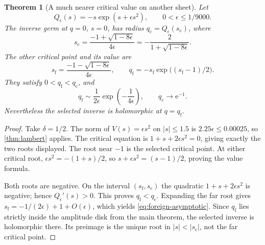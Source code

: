 \documentclass[11pt,a4paper]{article}
\numberwithin{equation}{section}
\newtheorem{theorem}{Theorem}[section]
\theoremstyle{definition}
\theoremstyle{remark}
\newcommand{\e}{\mathrm e}
\newcommand{\scv}{s_{\mathrm c}}
\newcommand{\qcv}{q_{\mathrm c}}
\begin{document}
\begin{theorem}[A much nearer critical value on another sheet]
\label{thm:foreign}
Let
\begin{equation}
 Q_\epsilon(s)=-s\exp(s+\epsilon s^2),
 \qquad 0<\epsilon\leq1/9000.
 \label{eq:quadratic-Q}
\end{equation}
The inverse germ at $q=0$, $s=0$, has radius $\qcv=Q_\epsilon(\scv)$, where
\begin{equation}
 \scv=\frac{-1+\sqrt{1-8\epsilon}}{4\epsilon}
      =-\frac{2}{1+\sqrt{1-8\epsilon}}.
 \label{eq:quadratic-sc}
\end{equation}
The other critical point and its value are
\begin{equation}
 s_{\mathrm f}=\frac{-1-\sqrt{1-8\epsilon}}{4\epsilon},
 \qquad q_{\mathrm f}=-s_{\mathrm f}
                       \exp\bigl((s_{\mathrm f}-1)/2\bigr).
 \label{eq:foreign-critical}
\end{equation}
They satisfy $0<q_{\mathrm f}<\qcv$, and
\begin{equation}
 q_{\mathrm f}\sim\frac1{2\epsilon}\exp\left(-\frac1{4\epsilon}\right),
 \qquad \qcv\longrightarrow\e^{-1}.
 \label{eq:foreign-asymptotic}
\end{equation}
Nevertheless the selected inverse is holomorphic at $q=q_{\mathrm f}$.
\end{theorem}
\begin{proof}
Take $\delta=1/2$. The norm of $V(s)=\epsilon s^2$ on $|s|\leq1.5$ is $2.25\epsilon\leq0.00025$, so \cref{thm:lambert} applies. The critical equation is
$1+s+2\epsilon s^2=0$, giving exactly the two roots displayed. The root near $-1$ is the selected critical point. At either critical root,
$\epsilon s^2=-(1+s)/2$, so $s+\epsilon s^2=(s-1)/2$, proving the value formula.

Both roots are negative. On the interval $(s_{\mathrm f},\scv)$ the quadratic $1+s+2\epsilon s^2$ is negative; hence $Q_\epsilon'(s)>0$. This proves $q_{\mathrm f}<\qcv$. Expanding the far root gives
$s_{\mathrm f}=-1/(2\epsilon)+1+O(\epsilon)$, which yields \eqref{eq:foreign-asymptotic}. Since $q_{\mathrm f}$ lies strictly inside the amplitude disk from the main theorem, the selected inverse is holomorphic there. Its preimage is the unique root in $|s|<|\scv|$, not the far critical point.
\end{proof}
\end{document}
